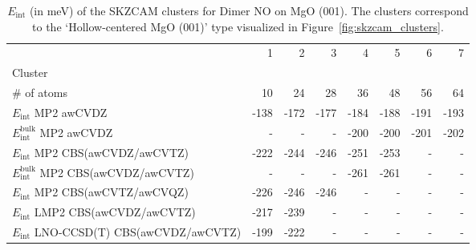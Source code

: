 \begin{table}
\caption{\label{tab:system_eint_mgo_no_dimer}$E_\textrm{int}$ (in meV) of the SKZCAM clusters for Dimer NO on MgO (001). The clusters correspond to the `Hollow-centered MgO (001)' type visualized in Figure~\ref{fig:skzcam_clusters}.}
\begin{adjustbox}{center,max width=1.4\textwidth}
\begin{tabular}{lrrrrrrr}
\toprule
 & 1 & 2 & 3 & 4 & 5 & 6 & 7 \\ 
Cluster &  &  &  &  &  &  &  \\
\midrule
\# of atoms & 10 & 24 & 28 & 36 & 48 & 56 & 64 \\
$E_\textrm{int}$ MP2 awCVDZ & -138 & -172 & -177 & -184 & -188 & -191 & -193 \\
$E_\textrm{int}^\textrm{bulk}$ MP2 awCVDZ & - & - & - & -200 & -200 & -201 & -202 \\
$E_\textrm{int}$ MP2 CBS(awCVDZ/awCVTZ) & -222 & -244 & -246 & -251 & -253 & - & - \\
$E_\textrm{int}^\textrm{bulk}$ MP2 CBS(awCVDZ/awCVTZ) & - & - & - & -261 & -261 & - & - \\
$E_\textrm{int}$ MP2 CBS(awCVTZ/awCVQZ) & -226 & -246 & -246 & - & - & - & - \\
$E_\textrm{int}$ LMP2 CBS(awCVDZ/awCVTZ) & -217 & -239 & - & - & - & - & - \\
$E_\textrm{int}$ LNO-CCSD(T) CBS(awCVDZ/awCVTZ) & -199 & -222 & - & - & - & - & - \\
\bottomrule
\end{tabular}
\end{adjustbox}
\end{table}

